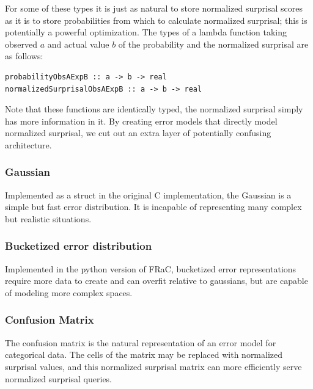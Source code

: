 \documentclass{article}
\newcommand{\CC}{C\nolinebreak\hspace{-.05em}\raisebox{.4ex}{\tiny\bf +}\nolinebreak\hspace{-.10em}\raisebox{.4ex}{\tiny\bf +}}
\begin{document}
\begin{multicols}{2}
\textcolor{cont}{For some of these types it is just as natural to store normalized surprisal scores as it is to store probabilities from which to calculate normalized surprisal; this is potentially a powerful optimization.}  The types of a lambda function taking observed $a$ and actual value $b$ of the probability and the normalized surprisal are as follows: 

\begin{verbatim}
probabilityObsAExpB :: a -> b -> real
normalizedSurprisalObsAExpB :: a -> b -> real
\end{verbatim}

Note that these functions are identically typed, the normalized surprisal simply has more information in it.  By creating error models that directly model normalized surprisal, we cut out an extra layer of potentially confusing architecture.

\subsubsection{Gaussian}

Implemented as a struct in the original \CC{} implementation, the Gaussian is a simple but fast error distribution.  It is incapable of representing many complex but realistic situations.

\color{reach}
\subsubsection{Bucketized error distribution}

Implemented in the python version of FRaC, bucketized error representations require more data to create and can overfit relative to gaussians, but are capable of modeling more complex spaces.

\color{textcol}

\subsubsection{Confusion Matrix}

The confusion matrix is the natural representation of an error model for categorical data.  The cells of the matrix may be replaced with normalized surprisal values, and this normalized surprisal matrix can more efficiently serve normalized surprisal queries.  


\end{multicols}
\end{document}
